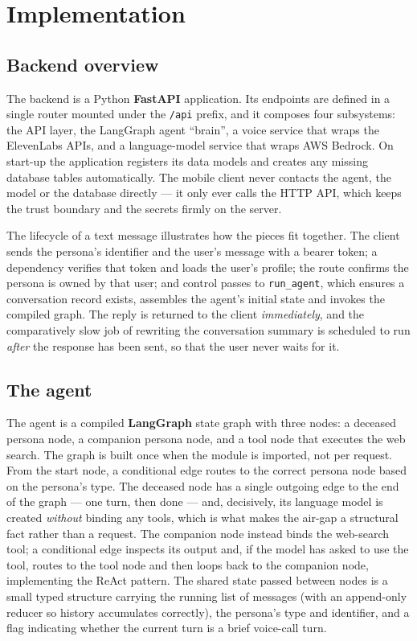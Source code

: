 \documentclass[11pt,a4paper]{report}
\begin{document}
\chapter{Implementation}
\label{ch:impl}

\section{Backend overview}
The backend is a Python \textbf{FastAPI} application. Its endpoints are defined in a single router mounted under the \texttt{/api} prefix, and it composes four subsystems: the API layer, the LangGraph agent ``brain'', a voice service that wraps the ElevenLabs APIs, and a language-model service that wraps AWS Bedrock. On start-up the application registers its data models and creates any missing database tables automatically. The mobile client never contacts the agent, the model or the database directly --- it only ever calls the HTTP API, which keeps the trust boundary and the secrets firmly on the server.

The lifecycle of a text message illustrates how the pieces fit together. The client sends the persona's identifier and the user's message with a bearer token; a dependency verifies that token and loads the user's profile; the route confirms the persona is owned by that user; and control passes to \texttt{run\_agent}, which ensures a conversation record exists, assembles the agent's initial state and invokes the compiled graph. The reply is returned to the client \emph{immediately}, and the comparatively slow job of rewriting the conversation summary is scheduled to run \emph{after} the response has been sent, so that the user never waits for it.

\section{The agent}
The agent is a compiled \textbf{LangGraph} state graph with three nodes: a deceased persona node, a companion persona node, and a tool node that executes the web search. The graph is built once when the module is imported, not per request. From the start node, a conditional edge routes to the correct persona node based on the persona's type. The deceased node has a single outgoing edge to the end of the graph --- one turn, then done --- and, decisively, its language model is created \emph{without} binding any tools, which is what makes the air-gap a structural fact rather than a request. The companion node instead binds the web-search tool; a conditional edge inspects its output and, if the model has asked to use the tool, routes to the tool node and then loops back to the companion node, implementing the ReAct pattern. The shared state passed between nodes is a small typed structure carrying the running list of messages (with an append-only reducer so history accumulates correctly), the persona's type and identifier, and a flag indicating whether the current turn is a brief voice-call turn.
\end{document}
